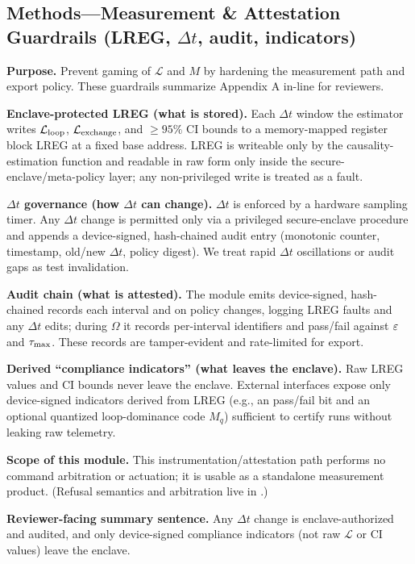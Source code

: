 \documentclass[11pt]{article}
\begin{document}
\subsection{Methods---Measurement \& Attestation Guardrails (LREG, $\Delta t$, audit, indicators)}
\label{sec:method_guardrails}

\textbf{Purpose.} Prevent gaming of $\mathcal{L}$ and $M$ by hardening the measurement path and export policy. These guardrails summarize Appendix A in-line for reviewers.

\textbf{Enclave-protected LREG (what is stored).} Each $\Delta t$ window the estimator writes $\mathcal{L}_{\text{loop}}$, $\mathcal{L}_{\text{exchange}}$, and $\geq 95\%$ CI bounds to a memory-mapped register block LREG at a fixed base address. LREG is writeable only by the causality-estimation function and readable in raw form only inside the secure-enclave/meta-policy layer; any non-privileged write is treated as a fault.

\textbf{$\Delta t$ governance (how $\Delta t$ can change).} $\Delta t$ is enforced by a hardware sampling timer. Any $\Delta t$ change is permitted only via a privileged secure-enclave procedure and appends a device-signed, hash-chained audit entry (monotonic counter, timestamp, old/new $\Delta t$, policy digest). We treat rapid $\Delta t$ oscillations or audit gaps as test invalidation.

\textbf{Audit chain (what is attested).} The module emits device-signed, hash-chained records each interval and on policy changes, logging LREG faults and any $\Delta t$ edits; during $\Omega$ it records per-interval identifiers and pass/fail against $\varepsilon$ and $\tau_{\max}$. These records are tamper-evident and rate-limited for export.

\textbf{Derived ``compliance indicators'' (what leaves the enclave).} Raw LREG values and CI bounds never leave the enclave. External interfaces expose only device-signed indicators derived from LREG (e.g., an \NC pass/fail bit and an optional quantized loop-dominance code $M_q$) sufficient to certify runs without leaking raw telemetry.

\textbf{Scope of this module.} This instrumentation/attestation path performs no command arbitration or actuation; it is usable as a standalone measurement product. (Refusal semantics and arbitration live in .)

\textbf{Reviewer-facing summary sentence.} Any $\Delta t$ change is enclave-authorized and audited, and only device-signed compliance indicators (not raw $\mathcal{L}$ or CI values) leave the enclave.
\end{document}
